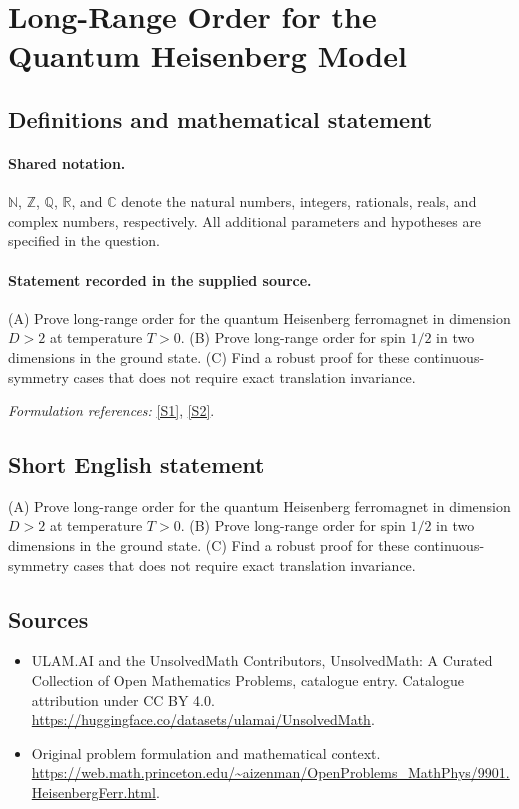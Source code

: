 \documentclass[11pt]{article}
\newcommand{\sref}[2]{\hyperlink{source:#1:#2}{[S#2]}}
\begin{document}
\section{Long-Range Order for the Quantum Heisenberg Model}\label{statement}

\subsection{Definitions and mathematical statement}

\paragraph{Shared notation.}$\mathbb N$, $\mathbb Z$, $\mathbb Q$, $\mathbb R$, and $\mathbb C$ denote the natural numbers, integers, rationals, reals, and complex numbers, respectively. All additional parameters and hypotheses are specified in the question.


\paragraph{Statement recorded in the supplied source.}
(A) Prove long-range order for the quantum Heisenberg ferromagnet in dimension $D>2$ at temperature $T>0$. (B) Prove long-range order for spin $1/2$ in two dimensions in the ground state. (C) Find a robust proof for these continuous-symmetry cases that does not require exact translation invariance.
\par\smallskip\textit{Formulation references:} \sref{statement}{1}, \sref{statement}{2}.
\subsection{Short English statement}
(A) Prove long-range order for the quantum Heisenberg ferromagnet in dimension $D>2$ at temperature $T>0$. (B) Prove long-range order for spin $1/2$ in two dimensions in the ground state. (C) Find a robust proof for these continuous-symmetry cases that does not require exact translation invariance.
\subsection{Sources}
\begin{itemize}
\item[\hypertarget{source:statement:1}{S1}] ULAM.AI and the UnsolvedMath Contributors, UnsolvedMath: A Curated Collection of Open Mathematics Problems, catalogue entry. Catalogue attribution under CC BY 4.0.
\url{https://huggingface.co/datasets/ulamai/UnsolvedMath}.
\item[\hypertarget{source:statement:2}{S2}] Original problem formulation and mathematical context.
\url{https://web.math.princeton.edu/~aizenman/OpenProblems_MathPhys/9901.HeisenbergFerr.html}.
\end{itemize}
\label{end:statement}
\end{document}
